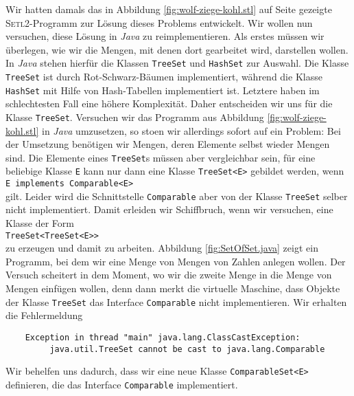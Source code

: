 \noindent
Wir hatten damals das in Abbildung
\ref{fig:wolf-ziege-kohl.stl} auf Seite \pageref{fig:wolf-ziege-kohl.stl} gezeigte
\textsc{Setl2}-Programm zur L\"osung dieses Problems entwickelt.  
Wir wollen nun versuchen, diese L\"osung in  \textsl{Java} zu reimplementieren.
Als erstes m\"ussen wir \"uberlegen, wie wir die Mengen, mit denen dort gearbeitet wird,
darstellen wollen.    In \textsl{Java} stehen hierf\"ur die Klassen \texttt{TreeSet}
und \texttt{HashSet} zur Auswahl.  Die Klasse \texttt{TreeSet} ist durch
Rot-Schwarz-B\"aumen implementiert, w\"ahrend die Klasse \texttt{HashSet} mit Hilfe von
Hash-Tabellen implementiert ist.  Letztere haben im schlechtesten Fall eine h\"ohere
Komplexit\"at.  Daher entscheiden wir uns f\"ur die Klasse \texttt{TreeSet}.  Versuchen wir
das Programm aus Abbildung \ref{fig:wolf-ziege-kohl.stl} in \textsl{Java} umzusetzen,
so sto\3en wir allerdings sofort auf ein Problem:  Bei der Umsetzung ben\"otigen wir Mengen,
deren Elemente selbst wieder Mengen sind.  Die Elemente eines \texttt{TreeSet}s m\"ussen
aber vergleichbar sein, f\"ur eine beliebige Klasse \texttt{E} kann nur dann eine Klasse
\texttt{TreeSet<E>} gebildet werden, wenn 
\\[0.2cm]
\hspace*{1.3cm}
\texttt{E implements Comparable<E>}
\\[0.2cm]
gilt.  Leider wird die Schnittstelle \texttt{Comparable} aber von der Klasse
\texttt{TreeSet} selber nicht implementiert.  Damit erleiden wir Schiffbruch, wenn wir
versuchen,  eine Klasse der Form 
\\[0.2cm]
\hspace*{1.3cm}
\texttt{TreeSet<TreeSet<E>>}
\\[0.2cm]
zu erzeugen und damit zu arbeiten.  Abbildung \ref{fig:SetOfSet.java} zeigt ein Programm,
bei dem wir eine Menge von Mengen von Zahlen anlegen wollen.  Der Versuch scheitert in dem
Moment, wo wir die zweite Menge in die Menge von Mengen einf\"ugen wollen, denn dann merkt
die virtuelle Maschine, dass Objekte der Klasse \texttt{TreeSet} das Interface
\texttt{Comparable} nicht implementieren.  Wir erhalten die Fehlermeldung
\begin{verbatim}
    Exception in thread "main" java.lang.ClassCastException: 
         java.util.TreeSet cannot be cast to java.lang.Comparable
\end{verbatim}
Wir behelfen uns dadurch, dass wir eine neue Klasse \texttt{ComparableSet<E>}
definieren, die das Interface \texttt{Comparable} implementiert.


